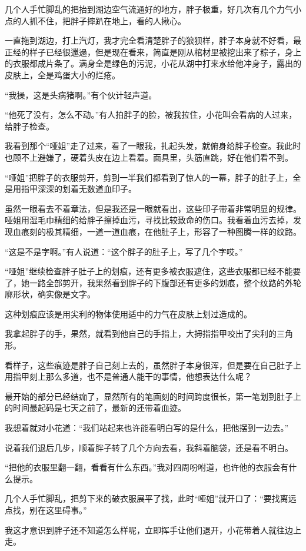 几个人手忙脚乱的把抬到湖边空气流通好的地方，胖子极重，好几次有几个力气小点的人抓不住，把胖子摔趴在地上，看的人揪心。

一直拖到湖边，打上汽灯，我才完全看清楚胖子的狼狈样，胖子本身就不好看，最正经的样子已经很邋遢，但是现在看来，简直是刚从棺材里被挖出来了粽子，身上的衣服都成片条了。满身全是绿色的污泥，小花从湖中打来水给他冲身子，露出的皮肤上，全是鸡蛋大小的烂疮。

“我操，这是头病猪啊。”有个伙计轻声道。

“他死了没有，怎么不动。”有人拍胖子的脸，被我拉住，小花叫会看病的人过来，给胖子检查。

我看到那个“哑姐”走了过来，看了一眼我，扎起头发，就俯身给胖子检查。我此时也顾不上避嫌了，硬着头皮在边上看着。面具里，头筋直跳，好在他们看不到。

“哑姐”把胖子的衣服剪开，剪到一半我们都看到了惊人的一幕，胖子的肚子上，全是用指甲深深的划着无数道血印子。

虽然一眼看去不着章法，但是我还是一眼就看出，这些印子带着非常明显的规律。哑姐用湿毛巾精细的给胖子擦掉血污，寻找比较致命的伤口。我看着血污去掉，发现血痕刻的极其精细，一道一道血痕，在他肚子上，形容了一种图腾一样的纹路。

“这是不是字啊。”有人说道：“这个胖子的肚子上，写了几个字哎。”

“哑姐”继续检查胖子肚子上的划痕，还有更多被衣服遮住，这些衣服都已经不能要了，她一路全部剪开，我果然看到胖子的下腹部还有更多的划痕，整个纹路的外轮廓形状，确实像是文字。

这种划痕应该是用尖利的物体使用适中的力气在皮肤上划过造成的。

我拿起胖子的手，果然，就看到他自己的手指上，大拇指指甲咬出了尖利的三角形。

看样子，这些痕迹是胖子自己刻上去的，虽然胖子本身很浑，但是要在自己肚子上用指甲刻上那么多道，也不是普通人能干的事情，他想表达什么呢？

最开始的部分已经结痂了，显然所有的笔画刻的时间跨度很长，第一笔划到肚子上的时间最起码是七天之前了，最新的还带着血迹。

我想着就对小花道：“我们站起来也许能看明白写的是什么，把他摆到一边去。”

说着我们退后几步，顺着胖子转了几个方向去看，我斜着脑袋，还是看不明白。

“把他的衣服里翻一翻，看看有什么东西。”我对四周吩咐道，也许他的衣服会有什么提示。

几个人手忙脚乱，把剪下来的破衣服展平了找，此时“哑姐”就开口了：“要找离远点找，别在这里碍事。”

我这才意识到胖子还不知道怎么样呢，立即挥手让他们退开，小花带着人就往边上走。

